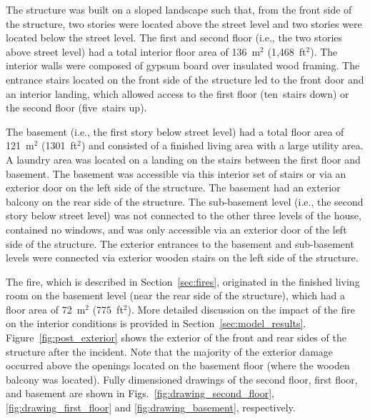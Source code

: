 \documentclass[12pt,oneside]{book}
\begin{document}
The structure was built on a sloped landscape such that, from the front side of the structure, two stories were located above the street level and two stories were located below the street level. The first and second floor (i.e., the two stories above street level) had a total interior floor area of 136~m$^2$ (1,468~ft$^2$). The interior walls were composed of gypsum board over insulated wood framing. The entrance stairs located on the front side of the structure led to the front door and an interior landing, which allowed access to the first floor (ten~stairs down) or the second floor (five~stairs up).

The basement (i.e., the first story below street level) had a total floor area of 121~m$^2$ (1301~ft$^2$) and consisted of a finished living area with a large utility area. A laundry area was located on a landing on the stairs between the first floor and basement. The basement was accessible via this interior set of stairs or via an exterior door on the left side of the structure. The basement had an exterior balcony on the rear side of the structure. The sub-basement level (i.e., the second story below street level) was not connected to the other three levels of the house, contained no windows, and was only accessible via an exterior door of the left side of the structure. The exterior entrances to the basement and sub-basement levels were connected via exterior wooden stairs on the left side of the structure.

The fire, which is described in Section~\ref{sec:fires}, originated in the finished living room on the basement level (near the rear side of the structure), which had a floor area of 72~m$^2$ (775~ft$^2$). More detailed discussion on the impact of the fire on the interior conditions is provided in Section~\ref{sec:model_results}. Figure~\ref{fig:post_exterior} shows the exterior of the front and rear sides of the structure after the incident. Note that the majority of the exterior damage occurred above the openings located on the basement floor (where the wooden balcony was located). Fully dimensioned drawings of the second floor, first floor, and basement are shown in Figs.~\ref{fig:drawing_second_floor}, \ref{fig:drawing_first_floor} and \ref{fig:drawing_basement}, respectively.
\end{document}
